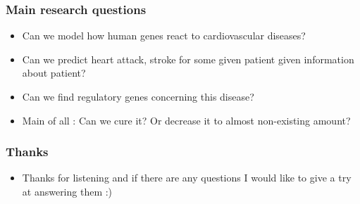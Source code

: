 \documentclass{beamer}
\begin{document}
\begin{frame}
\frametitle{Main research questions}
	\begin{itemize}
		\item Can we model how human genes react to cardiovascular diseases?
		\item Can we predict heart attack, stroke for some given patient given information about patient?
		\item Can we find regulatory genes concerning this disease?
		\item Main of all : Can we cure it? Or decrease it to almost non-existing amount?
	\end{itemize}
\end{frame}


\begin{frame}
\frametitle{Thanks}
	\begin{itemize}
		\item Thanks for listening and if there are any questions I would like to give a try at answering them :)
	\end{itemize}
\end{frame}

\end{document}
